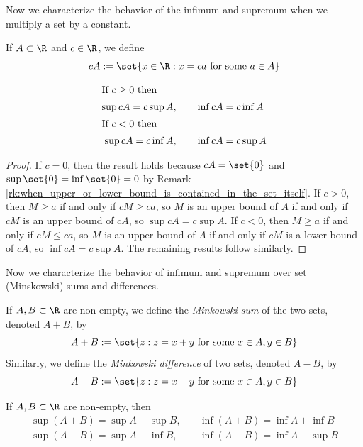 \documentclass{article} %
\begin{document}
Now we characterize the behavior of the infimum and supremum when we multiply a set by a constant.

\begin{definition}
If $A \subset \R$ and $c \in \R$, we define
\[ cA := \set{x \in \R : x = ca \text{ for some } a \in A}\]	
\end{definition}

\begin{proposition}

\begin{align*}
\intertext{If $c \geq 0$ then} 
\sup cA = c \sup A, &\quad \quad \inf cA = c \inf A\\
\intertext{If $c < 0$ then} 
\sup cA = c \inf A, &\quad \quad \inf cA = c \sup A
\end{align*}
\label{prop:supremum_and_infimum_under_constant_multiples_of_sets}
\end{proposition}

\begin{proof}
If $c=0$, then the result holds because $cA = \set{0}$ and $\sup \set{0} = \inf \set{0} = 0$ by Remark \ref{rk:when_upper_or_lower_bound_is_contained_in_the_set_itself}.	If $c >0$, then $M \geq a$ if and only if $cM \geq ca$, so $M$ is an upper bound of $A$ if and only if $cM$ is an upper bound of $cA$, so $\sup cA = c \sup A$.   If $c<0$, then $M \geq a$ if and only if $cM \leq ca$, so $M$ is an upper bound of $A$ if and only if $cM$ is a lower bound of $cA$, so $\inf cA = c \sup A$.  The remaining results follow similarly. 
\end{proof}


Now we characterize the behavior of infimum and supremum over set (Minskowski) sums and differences.

\begin{definition}
If $A, B \subset \R$ are non-empty, we define the \textit{Minkowski sum} of the two sets, denoted $A+B$, by 
\[ A + B := \set{z : z = x + y \text{ for some } x \in A, y \in B } \]
Similarly, we define the \textit{Minkowski difference} of two sets, denoted $A-B$, by
\[ A - B := \set{z : z = x - y \text{ for some } x \in A, y \in B } \]
\label{def:minkowski_sum_and_difference}	
\end{definition}

\begin{proposition}
If $A, B \subset \R$ are non-empty, then 
\begin{align*}
\sup (A+B) = \sup A + \sup B, &\quad \inf (A+B) = \inf A + \inf B 	 \\
\sup (A-B) = \sup A - \inf B, &\quad \inf (A-B) = \inf A - \sup B 	 \\
\end{align*}

\label{prop:sup_and_inf_for_minkowski_sum_and_diff}	
\end{proposition}
\end{document}
